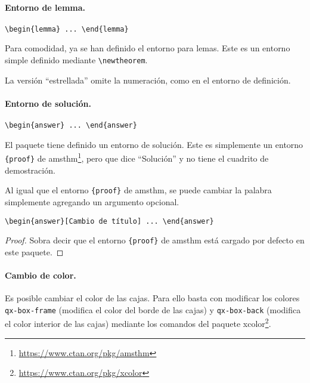\documentclass[11pt]{article}
\begin{document}
\paragraph{Entorno de lemma.}  \verb|\begin{lemma} ... \end{lemma}|

\begin{lemma}
  Para comodidad, ya se han definido el entorno para lemas. Este es un entorno simple definido mediante \verb|\newtheorem|.
\end{lemma}

\begin{lemma*}
  La versión ``estrellada'' omite la numeración, como en el entorno de definición.
\end{lemma*}


\paragraph{Entorno de solución.} \verb|\begin{answer} ... \end{answer}|

\begin{answer}
  El paquete tiene definido un entorno de solución. Este es simplemente un entorno \verb|{proof}| de \textsf{amsthm}\footnote{\url{https://www.ctan.org/pkg/amsthm}}, pero que dice ``Solución'' y no tiene el cuadrito de demostración.
\end{answer}

\begin{answer}
  Al igual que el entorno \verb|{proof}| de \textsf{amsthm}, se puede cambiar la palabra simplemente agregando un argumento opcional.

  \verb|\begin{answer}[Cambio de título] ... \end{answer}|
\end{answer}

\begin{proof}
  Sobra decir que el entorno \verb|{proof}| de \textsf{amsthm} está cargado por defecto en este paquete.
\end{proof}


\paragraph{Cambio de color.} Es posible cambiar el color de las cajas. Para ello basta con modificar los colores \texttt{qx-box-frame} (modifica el color del borde de las cajas) y \texttt{qx-box-back} (modifica el color interior de las cajas) mediante los comandos del paquete \textsf{xcolor}\footnote{\url{https://www.ctan.org/pkg/xcolor}}.
\end{document}
